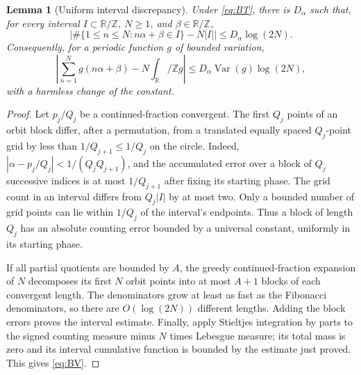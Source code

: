 \documentclass[11pt,a4paper]{article}
\newtheorem{lemma}[theorem]{Lemma}
\theoremstyle{definition}
\theoremstyle{remark}\newtheorem{remark}[theorem]{Remark}
\newcommand{\T}{\mathbb R/\mathbb Z}
\begin{document}
\begin{lemma}[Uniform interval discrepancy]
\label{lem:discrepancy}
Under \eqref{eq:BT}, there is $D_\alpha$ such that, for every interval
$I\subset\T$, $N\ge1$, and $\beta\in\T$,
\[
 \left|\#\{1\le n\le N:n\alpha+\beta\in I\}-N|I|\right|
 \le D_\alpha\log(2N).
\]
Consequently, for a periodic function $g$ of bounded variation,
\begin{equation}
 \left|\sum_{n=1}^N g(n\alpha+\beta)-N\int_\T g\right|
 \le D_\alpha\operatorname{Var}(g)\log(2N),
 \label{eq:BV}
\end{equation}
with a harmless change of the constant.
\end{lemma}
\begin{proof}
Let $p_j/Q_j$ be a continued-fraction convergent.  The first $Q_j$ points
of an orbit block differ, after a permutation, from a translated equally
spaced $Q_j$-point grid by less than $1/Q_{j+1}\le1/Q_j$ on the circle.
Indeed, $|\alpha-p_j/Q_j|<1/(Q_jQ_{j+1})$, and the accumulated error over a
block of $Q_j$ successive indices is at most $1/Q_{j+1}$ after fixing its
starting phase.  The grid count in an interval differs from $Q_j|I|$ by
at most two.  Only a bounded number of grid points can lie within $1/Q_j$
of the interval's endpoints.  Thus a block of length $Q_j$ has an absolute
counting error bounded by a universal constant, uniformly in its starting
phase.

If all partial quotients are bounded by $A$, the greedy continued-fraction
expansion of $N$ decomposes its first $N$ orbit points into at most $A+1$
blocks of each convergent length.  The denominators grow at least as fast
as the Fibonacci denominators, so there are $O(\log(2N))$ different lengths.
Adding the block errors proves the interval estimate.  Finally, apply
Stieltjes integration by parts to the signed counting measure minus
$N$ times Lebesgue measure; its total mass is zero and its interval
cumulative function is bounded by the estimate just proved.  This gives
\eqref{eq:BV}.
\end{proof}
\end{document}
